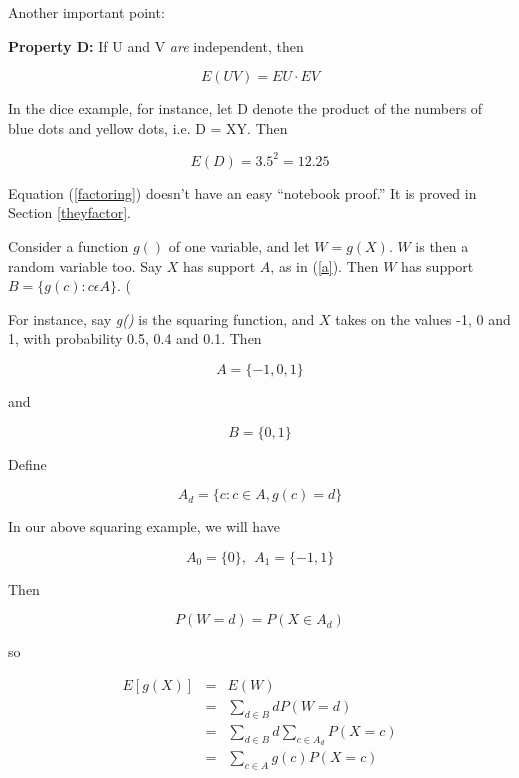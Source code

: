 Another important point:

{\bf Property D:} If U and V {\it are} independent, then

\begin{equation}
\label{factoring}
E(UV) = EU \cdot EV
\end{equation}


In the dice example, for instance, let D denote the product of the
numbers of blue dots and yellow dots, i.e. D = XY.  Then

\begin{equation}
E(D) = 3.5^2 = 12.25
\end{equation}

Equation (\ref{factoring}) doesn't have an easy ``notebook proof.'' It
is proved in Section \ref{theyfactor}.

Consider a function $g()$ of one variable, and let $W = g(X)$.  $W$ is then a
random variable too.  Say $X$ has support $A$, as in (\ref{a}).  Then $W$ has
support $B = \{g(c): c \epsilon A \}$.  (

For instance, say {\it g()} is the squaring function, and $X$ takes on
the values -1, 0 and 1, with probability 0.5, 0.4 and 0.1.  Then

\begin{equation}
A = \{ -1,0,1 \}
\end{equation}

and 

\begin{equation}
B = \{ 0,1 \}
\end{equation}

Define

\begin{equation}
A_d = \{c: c \in A, g(c) = d\}
\end{equation}

In our above squaring example, we will have

\begin{equation}
A_0 = \{ 0 \}, ~~ A_1 = \{ -1,1 \}
\end{equation}

Then 

\begin{equation}
P(W = d) = P(X \in A_d) 
\end{equation}

so

\begin{eqnarray}
E[g(X)] &=& E(W) \\
&=& \sum_{d \in B} d P(W = d) \\ 
&=& \sum_{d \in B} d \sum_{c \in A_d} P(X = c) \\
&=& \sum_{c \in A} g(c) P(X = c) 
\end{eqnarray}

